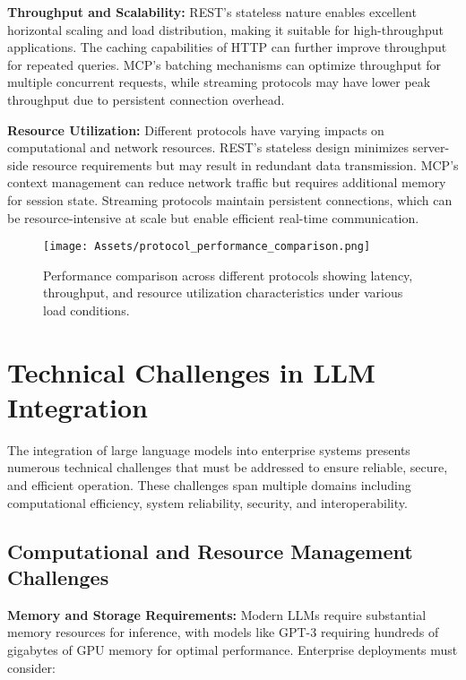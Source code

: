 \textbf{Throughput and Scalability:}
REST's stateless nature enables excellent horizontal scaling and load distribution, making it suitable for high-throughput applications. The caching capabilities of HTTP can further improve throughput for repeated queries. MCP's batching mechanisms can optimize throughput for multiple concurrent requests, while streaming protocols may have lower peak throughput due to persistent connection overhead.

\textbf{Resource Utilization:}
Different protocols have varying impacts on computational and network resources. REST's stateless design minimizes server-side resource requirements but may result in redundant data transmission. MCP's context management can reduce network traffic but requires additional memory for session state. Streaming protocols maintain persistent connections, which can be resource-intensive at scale but enable efficient real-time communication.

\begin{figure}[H]
    \centering
    \texttt{[image: Assets/protocol\_performance\_comparison.png]}
    \caption{Performance comparison across different protocols showing latency, throughput, and resource utilization characteristics under various load conditions.\cite{claudePerformanceComparison}}
    \label{fig:protocol_performance_comparison}
\end{figure}

\section{Technical Challenges in LLM Integration}

The integration of large language models into enterprise systems presents numerous technical challenges that must be addressed to ensure reliable, secure, and efficient operation. These challenges span multiple domains including computational efficiency, system reliability, security, and interoperability.

\subsection{Computational and Resource Management Challenges}

\textbf{Memory and Storage Requirements:}
Modern LLMs require substantial memory resources for inference, with models like GPT-3 requiring hundreds of gigabytes of GPU memory for optimal performance. Enterprise deployments must consider:

